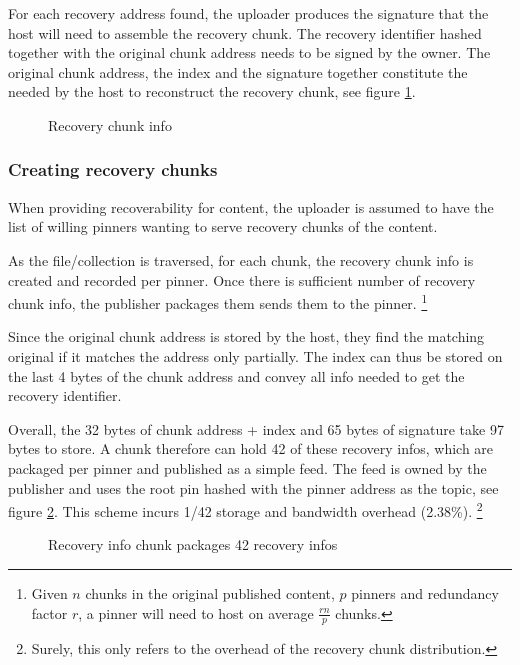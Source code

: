 For each recovery address found, the uploader produces the signature that the host will need to assemble the recovery chunk. The recovery identifier hashed together with the original chunk  address needs to be signed by the owner. The original chunk address, the index and the signature together constitute the  needed by the host to reconstruct the recovery chunk, see figure \ref{fig:recovery-chunk-info}.

\begin{figure}[htbp]
  \centering
  \caption[Recovery chunk info \statusred]{Recovery chunk info}
  \label{fig:recovery-chunk-info}
\end{figure}

\subsubsection{Creating recovery chunks}

When providing recoverability for content, the uploader is assumed to have the list of willing pinners wanting to serve recovery chunks of the content. 

As the file/collection is traversed, for each chunk, the recovery chunk info is created and recorded per pinner. Once there is sufficient number of recovery chunk info, the publisher packages them sends them to the pinner.%
%
\footnote{Given $n$ chunks in the original published content, $p$ pinners and redundancy factor $r$, a pinner will need to host on average $\frac{rn}{p}$ chunks.}
%

Since the original chunk address is stored by the host, they find the matching original if it matches the address  only partially. The index can thus be stored on the last 4 bytes of the chunk address and convey all info needed to get the recovery identifier. 

Overall, the 32 bytes of chunk address + index and 65 bytes of signature take 97 bytes to store. A chunk therefore can hold 42 of these recovery infos, which are packaged per pinner and published as a simple feed. The feed is owned by the publisher and uses the root pin hashed with the pinner address as the topic, see figure \ref{fig:recovery-info-chunk}.
This scheme incurs 1/42 storage and bandwidth overhead (2.38\%).%
%
\footnote{Surely, this only refers to the overhead of the recovery chunk distribution.
}


\begin{figure}[htbp]
  \centering
  \caption[Recovery info chunk \statusred]{Recovery info chunk packages 42 recovery infos}
  \label{fig:recovery-info-chunk}
\end{figure}

